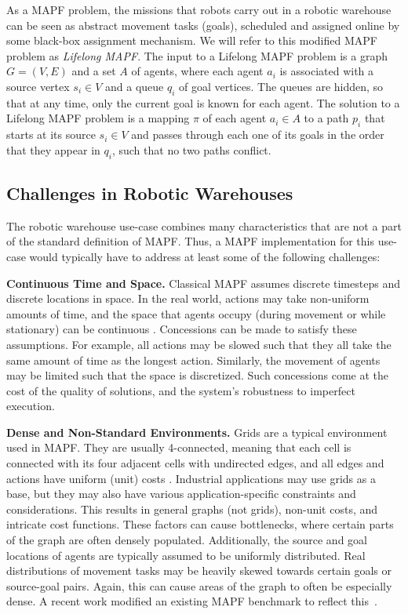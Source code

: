 \documentclass{article}
\newcommand{\lm}{Lifelong MAPF\xspace}
\begin{document}
As a MAPF problem, the missions that robots carry out in a robotic warehouse can be seen as abstract movement tasks (goals), scheduled and assigned online by some black-box assignment mechanism. We will refer to this modified MAPF problem as \emph{\lm}. The input to a \lm problem is a graph $G=(V,E)$ and a set $A$ of agents, where each agent $a_i$ is associated with a source vertex $s_i \in V$ and a queue $q_i$ of goal vertices. 
The queues are hidden, so that at any time, only the current goal is known for each agent. 
The solution to a \lm problem is a mapping $\pi$ of each agent $a_i\in A$ to a path $p_i$ that starts at its source $s_i\in V$ and passes through each one of its goals in the order that they appear in $q_i$, such that no two paths conflict. 

\subsection{Challenges in Robotic Warehouses}

The robotic warehouse use-case combines many characteristics that are not a part of the standard definition of MAPF. Thus, a MAPF implementation for this use-case would typically have to address at least some of the following challenges:

\textbf{Continuous Time and Space.} Classical MAPF assumes discrete timesteps and discrete locations in space. In the real world, actions may take non-uniform amounts of time, and the space that agents occupy (during movement or while stationary) can be continuous \cite{andreychuk2022multi,li2019multi,atzmon2020generalizing}. Concessions can be made to satisfy these assumptions. For example, all actions may be slowed such that they all take the same amount of time as the longest action. Similarly, the movement of agents may be limited such that the space is discretized. Such concessions come at the cost of the quality of solutions, and the system's robustness to imperfect execution. 

\textbf{Dense and Non-Standard Environments.} Grids are a typical environment used in MAPF. They are usually 4-connected, meaning that each cell is connected with its four adjacent cells with undirected edges, and all edges and actions have uniform (unit) costs \cite{stern2019multi}. Industrial applications may use grids as a base, but they may also have various application-specific constraints and considerations. This results in general graphs (not grids), non-unit costs, and intricate cost functions. These factors can cause bottlenecks, where certain parts of the graph are often densely populated.
Additionally, the source and goal locations of agents are typically assumed to be uniformly distributed. Real distributions of movement tasks may be heavily skewed towards certain goals or source-goal pairs. Again, this can cause areas of the graph to often be especially dense. A recent work modified an existing MAPF benchmark to reflect this~\cite{kaduri2021experimental}.
\end{document}
